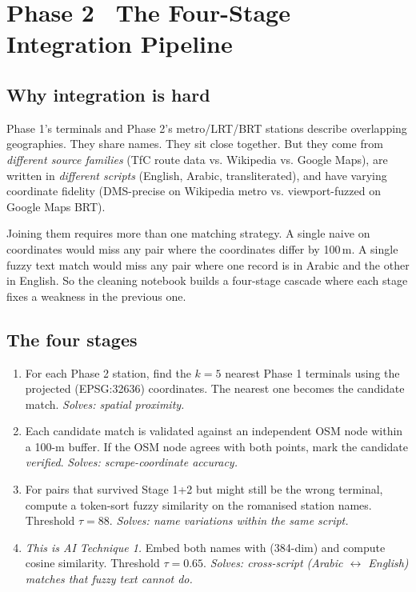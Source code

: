
\section{Phase 2 \textbullet\ The Four-Stage Integration Pipeline}
\label{sec:phase2-integration}

\subsection{Why integration is hard}

Phase 1's terminals and Phase 2's metro/LRT/BRT stations describe
overlapping geographies. They share names. They sit close together.
But they come from \emph{different source families} (TfC route data
vs. Wikipedia vs. Google Maps), are written in \emph{different
scripts} (English, Arabic, transliterated), and have varying
coordinate fidelity (DMS-precise on Wikipedia metro vs.
viewport-fuzzed on Google Maps BRT).

Joining them requires more than one matching strategy. A single naive
 on coordinates would miss any pair where the coordinates
differ by 100\,m. A single fuzzy text match would miss any pair where
one record is in Arabic and the other in English. So the cleaning
notebook builds a four-stage cascade where each stage fixes a
weakness in the previous one.

\subsection{The four stages}

\begin{enumerate}
 \item {} For each Phase 2 station, find the
 $k=5$ nearest Phase 1 terminals using the projected
 (EPSG:32636) coordinates. The nearest one becomes the
 candidate match. \emph{Solves: spatial proximity.}
 \item {} Each candidate match is
 validated against an independent OSM node within a 100-m
 buffer. If the OSM node agrees with both points, mark the
 candidate \emph{verified}. \emph{Solves: scrape-coordinate
 accuracy.}
 \item {} For pairs that survived
 Stage 1+2 but might still be the wrong terminal, compute a
 token-sort fuzzy similarity on the romanised station names.
 Threshold $\tau = 88$. \emph{Solves: name variations within
 the same script.}
 \item {}
 \emph{This is AI Technique 1.} Embed both names with
 (384-dim) and compute cosine similarity. Threshold
 $\tau = 0.65$. \emph{Solves: cross-script (Arabic $\leftrightarrow$
 English) matches that fuzzy text cannot do.}
\end{enumerate}

